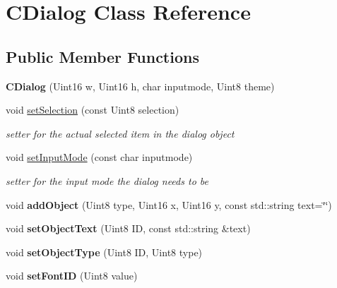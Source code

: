 \hypertarget{class_c_dialog}{
\section{CDialog Class Reference}
\label{class_c_dialog}
}
\subsection*{Public Member Functions}
\begin{DoxyCompactItemize}
\item 
\hypertarget{class_c_dialog_ac33fc3fc712e87dd8dc94172ae0dc4c9}{
{\bfseries CDialog} (Uint16 w, Uint16 h, char inputmode, Uint8 theme)}
\label{class_c_dialog_ac33fc3fc712e87dd8dc94172ae0dc4c9}

\item 
void \hyperlink{class_c_dialog_aba01d15c9428333b2252298a82560e2e}{setSelection} (const Uint8 selection)
\begin{DoxyCompactList}\small\item\em setter for the actual selected item in the dialog object \item\end{DoxyCompactList}\item 
void \hyperlink{class_c_dialog_a494de44c4883f77a6bd0f56aeafa3d5d}{setInputMode} (const char inputmode)
\begin{DoxyCompactList}\small\item\em setter for the input mode the dialog needs to be \item\end{DoxyCompactList}\item 
\hypertarget{class_c_dialog_a1e3208727c5217f0e8dd4d705dee6094}{
void {\bfseries addObject} (Uint8 type, Uint16 x, Uint16 y, const std::string text=\char`\"{}\char`\"{})}
\label{class_c_dialog_a1e3208727c5217f0e8dd4d705dee6094}

\item 
\hypertarget{class_c_dialog_a8e67267c4540a4fd3da0400c9b00d9e8}{
void {\bfseries setObjectText} (Uint8 ID, const std::string \&text)}
\label{class_c_dialog_a8e67267c4540a4fd3da0400c9b00d9e8}

\item 
\hypertarget{class_c_dialog_aa062b836b9525cc2ef935e418d3de1c2}{
void {\bfseries setObjectType} (Uint8 ID, Uint8 type)}
\label{class_c_dialog_aa062b836b9525cc2ef935e418d3de1c2}

\item 
\hypertarget{class_c_dialog_a054b890ff5770b51f0fac0ff59911b06}{
void {\bfseries setFontID} (Uint8 value)}
\label{class_c_dialog_a054b890ff5770b51f0fac0ff59911b06}


\end{DoxyCompactItemize}
